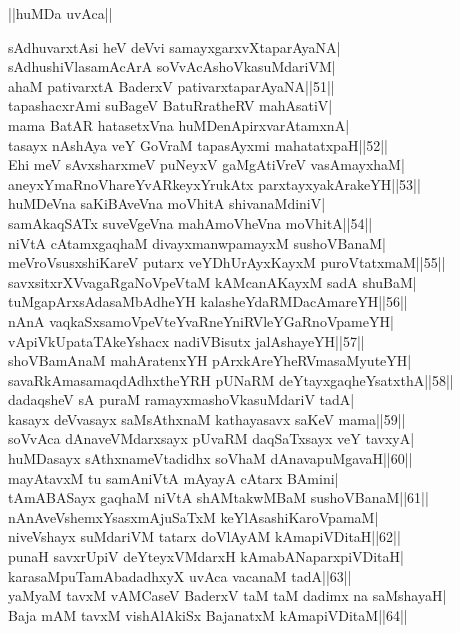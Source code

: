 \documentclass{article}
\begin{document}
\begin{center}
||huMDa uvAca||
\end{center}

sAdhuvarxtAsi heV deVvi samayxgarxvXtaparAyaNA|\\
sAdhushiVlasamAcArA soVvAcAshoVkasuMdariVM|\\
ahaM pativarxtA BaderxV pativarxtaparAyaNA||51||\\
tapashacxrAmi suBageV BatuRratheRV mahAsatiV|\\
mama BatAR hatasetxVna huMDenApirxvarAtamxnA|\\
tasayx nAshAya veY GoVraM tapasAyxmi mahatatxpaH||52||\\
Ehi meV sAvxsharxmeV puNeyxV gaMgAtiVreV vasAmayxhaM|\\
aneyxYmaRnoVhareYvARkeyxYrukAtx parxtayxyakArakeYH||53||\\
huMDeVna saKiBAveVna moVhitA shivanaMdiniV|\\
samAkaqSATx suveVgeVna mahAmoVheVna moVhitA||54||\\
niVtA cAtamxgaqhaM divayxmanwpamayxM sushoVBanaM|\\
meVroVsusxshiKareV putarx veYDhUrAyxKayxM puroVtatxmaM||55||\\
savxsitxrXVvagaRgaNoVpeVtaM kAMcanAKayxM  sadA shuBaM|\\
tuMgapArxsAdasaMbAdheYH kalasheYdaRMDacAmareYH||56||\\
nAnA vaqkaSxsamoVpeVteYvaRneYniRVleYGaRnoVpameYH|\\
vApiVkUpataTAkeYshacx nadiVBisutx jalAshayeYH||57||\\
shoVBamAnaM mahAratenxYH pArxkAreYheRVmasaMyuteYH|\\
savaRkAmasamaqdAdhxtheYRH pUNaRM deYtayxgaqheYsatxthA||58||\\
dadaqsheV sA puraM ramayxmashoVkasuMdariV tadA|\\
kasayx deVvasayx saMsAthxnaM kathayasavx saKeV mama||59||\\
soVvAca dAnaveVMdarxsayx pUvaRM daqSaTxsayx veY tavxyA|\\
huMDasayx sAthxnameVtadidhx soVhaM dAnavapuMgavaH||60||\\
mayAtavxM tu samAniVtA mAyayA cAtarx BAmini|\\
tAmABASayx gaqhaM niVtA shAMtakwMBaM sushoVBanaM||61||\\
nAnAveVshemxYsasxmAjuSaTxM keYlAsashiKaroVpamaM|\\
niveVshayx suMdariVM tatarx doVlAyAM kAmapiVDitaH||62||\\
punaH savxrUpiV deYteyxVMdarxH kAmabANaparxpiVDitaH|\\
karasaMpuTamAbadadhxyX uvAca vacanaM tadA||63||\\
yaMyaM tavxM vAMCaseV BaderxV taM taM dadimx na saMshayaH|\\
Baja mAM tavxM vishAlAkiSx BajanatxM kAmapiVDitaM||64||\\
\end{document}
